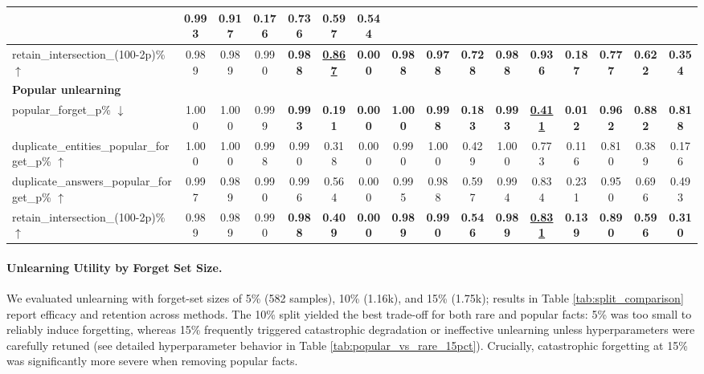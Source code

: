 \documentclass[sigconf,anonymous]{aamas}
\begin{document}
\begin{table}[t]
{\begin{tabular}{l|ccc|ccc|ccc|ccc|ccc}
  & 0.993 & 0.917 & 0.176 
  & 0.736 & 0.597 & 0.544 \\
\hline
retain\_intersection\_{(100-2p)\%} $\uparrow$
  & 0.989 & 0.989 & 0.990 
  & \textbf{0.988} & \textbf{\underline{0.867}} & \textbf{0.000} 
  & \textbf{0.988} & \textbf{0.978} & \textbf{0.728} 
  & \textbf{0.988} & \textbf{0.936} & \textbf{0.187} 
  & \textbf{0.777} & \textbf{0.622} & \textbf{0.354} \\
\hline
\multicolumn{16}{l}{\textbf{Popular unlearning}} \\
\hline
popular\_forget\_p\% $\downarrow$
  & 1.000 & 1.000 & 0.999 
  & \textbf{0.993} & \textbf{0.191} & \textbf{0.000} 
  & \textbf{1.000} & \textbf{0.998} & \textbf{0.183} 
  & \textbf{0.993} & \textbf{\underline{0.411}} & \textbf{0.012} 
  & \textbf{0.962} & \textbf{0.882} & \textbf{0.818} \\
\hline
duplicate\_entities\_popular\_forget\_p\% $\uparrow$
  & 1.000 & 1.000 & 0.998 
  & 0.990 & 0.318 & 0.000 
  & 0.990 & 1.000 & 0.429 
  & 1.000 & 0.773 & 0.116 
  & 0.810 & 0.389 & 0.176 \\
\hline
duplicate\_answers\_popular\_forget\_p\% $\uparrow$
  & 0.997 & 0.989 & 0.990 
  & 0.996 & 0.564 & 0.000 
  & 0.995 & 0.988 & 0.597 
  & 0.994 & 0.834 & 0.231 
  & 0.950 & 0.696 & 0.493 \\
\hline
retain\_intersection\_{(100-2p)\%} $\uparrow$
  & 0.989 & 0.989 & 0.990 
  & \textbf{0.988} & \textbf{0.409} & \textbf{0.000} 
  & \textbf{0.989} & \textbf{0.990} & \textbf{0.546} 
  & \textbf{0.989} & \textbf{\underline{0.831}} & \textbf{0.139} 
  & \textbf{0.890} & \textbf{0.596} & \textbf{0.310} \\
\hline
\end{tabular}
}

\end{table}





\paragraph{Unlearning Utility by Forget Set Size.}
We evaluated unlearning with forget-set sizes of 5\% (582 samples), 10\% (1.16k), and 15\% (1.75k); results in Table \ref{tab:split_comparison} report efficacy and retention across methods. The 10\% split yielded the best trade-off for both rare and popular facts: 5\% was too small to reliably induce forgetting, whereas 15\% frequently triggered catastrophic degradation or ineffective unlearning unless hyperparameters were carefully retuned (see detailed hyperparameter behavior in Table \ref{tab:popular_vs_rare_15pct}). Crucially, catastrophic forgetting at 15\% was significantly more severe when removing popular facts.
\end{document}
